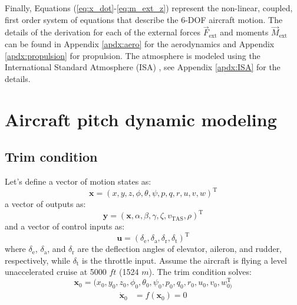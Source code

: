 \documentclass[lettersize,journal]{IEEEtran}
\begin{document}
Finally, Equations (\ref{eq:x_dot}-\ref{eq:m_ext_z}) represent the non-linear, coupled, first order system of equations that describe the 6-DOF aircraft motion. The details of the derivation for each of the external forces $\overrightarrow{F}_{\mathrm{ext}}$ and moments $\overrightarrow{M}_{\mathrm{ext}}$ can be found in Appendix \ref{apdx:aero} for the aerodynamics and Appendix \ref{apdx:propulsion} for propulsion. The atmosphere is modeled using the International Standard Atmosphere (ISA) \cite{ref16}, see Appendix \ref{apdx:ISA} for the details.

\section{Aircraft pitch dynamic modeling}

\subsection{Trim condition}
Let's define a vector of motion states as:
\begin{equation}\label{eq:full_states}
\bm{x}=(x, y, z, \phi, \theta, \psi, p, q, r, u, v, w)^{\mathrm{T}}
\end{equation}
a vector of outputs as:
\begin{equation}\label{eq:full_outputs}
\bm{y}=(\bm{x},\alpha,\beta,\gamma,\zeta,v_{\mathrm{TAS}},\rho)^{\mathrm{T}}
\end{equation}
and a vector of control inputs as:
\begin{equation}\label{eq:full_states}
\bm{u}=(\delta_{\mathrm{e}}, \delta_{\mathrm{a}}, \delta_{\mathrm{r}}, \delta_{\mathrm{t}})^{\mathrm{T}}
\end{equation}
where $\delta_{\mathrm{e}}$, $\delta_{\mathrm{a}}$, and $\delta_{\mathrm{r}}$ are the deflection angles of elevator, aileron, and rudder, respectively, while $\delta_{\mathrm{t}}$ is the throttle input. Assume the aircraft is flying a level unaccelerated cruise at 5000 $ft$ (1524 $m$). The trim condition solves:
\begin{equation}\label{eq:trim_states}
\bm{x_\mathrm{0}}=(x_\mathrm{0}, y_\mathrm{0}, z_\mathrm{0}, \phi_\mathrm{0}, \theta_\mathrm{0}, \psi_\mathrm{0}, p_\mathrm{0}, q_\mathrm{0}, r_\mathrm{0}, u_\mathrm{0}, v_\mathrm{0}, w_\mathrm{0)}^{\mathrm{T}}
\end{equation}
\begin{equation}\label{eq:zero_states_dot}
\begin{aligned}
\bm{\dot{x}_\mathrm{0}}&=f(\bm{x_\mathrm{0}})=0
\end{aligned}
\end{equation}
\end{document}
